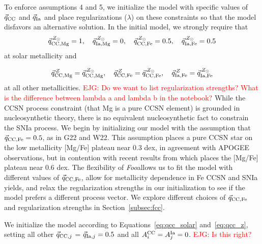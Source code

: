 \documentclass[modern]{aastex631}
\newcommand{\ejg}[1]{\textcolor{red}{EJG: #1}}
\newcommand{\name}{\textsl{Foo}} %
\begin{document}
To enforce assumptions 4 and 5, we initialize the model with specific values of $\vec{q}_{{\rm CC}}$ and $\vec{q}_{{\rm Ia}}$ and place regularizations ($\lambda$) on these constraints so that the model disfavors an alternative solution. In the initial model, we strongly require that
\begin{equation}\label{eq:qcc_solar}
    \vec{q}_{{\rm CC, Mg}}^{\,Z_{\odot}} = 1, \quad \vec{q}_{{\rm Ia, Mg}}^{\,Z_{\odot}} = 0, \quad 
    \vec{q}_{{\rm CC, Fe}}^{\,Z_{\odot}} = 0.5, \quad \vec{q}_{{\rm Ia, Fe}}^{\,Z_{\odot}} = 0.5
\end{equation}
at solar metallicity and 

\begin{equation}\label{eq:qcc_z}
    \vec{q}_{{\rm CC, Mg}}^{\,Z} = \vec{q}_{{\rm CC, Mg}}^{\,Z_{\odot}}, \quad 
    \vec{q}_{{\rm CC, Fe}}^{\,Z} = \vec{q}_{{\rm CC, Fe}}^{\,Z_{\odot}},  \quad 
    \vec{q}_{{\rm Ia, Fe}}^{\,Z} = \vec{q}_{{\rm Ia, Fe}}^{\,Z_{\odot}}
\end{equation}
at all other metallicities.
\ejg{Do we want to list regularization strengths? What is the difference between lambda a and lambda b in the notebook?} 
While the CCSN process constraint (that Mg is a pure CCSN element) is grounded in nucleosynthetic theory, there is no equivalent nucleosynthetic fact to constrain the SNIa process. We begin by initializing our model with the assumption that $\vec{q}_{{\rm CC, Fe}} = 0.5$, as in G22 and W22. This assumption places a pure CCSN star on the low metallicity [Mg/Fe] plateau near 0.3 dex, in agreement with APOGEE observations, but in contention with recent results from \citet{conroy2022} which places the [Mg/Fe] plateau near 0.6 dex. The flexibility of \name allows us to fit the model with different values of $\vec{q}_{{\rm CC, Fe}}$, allow for metallicity dependence in Fe CCSN and SNIa yields, and relax the regularization strengths in our initialization to see if the model prefers a different process vector. We explore different choices of $\vec{q}_{{\rm CC, Fe}}$ and regularization strengths in Section~\ref{subsec:fcc}.

We initialize the model according to Equations~\ref{eq:qcc_solar} and~\ref{eq:qcc_z}, setting all other $\vec{q}_{{\rm CC,}j}$ = $\vec{q}_{{\rm Ia,}j} = 0.5$ and all $A_i^{\rm CC} = A_j^{\rm Ia} = 0$. \ejg{Is this right?}
\end{document}
